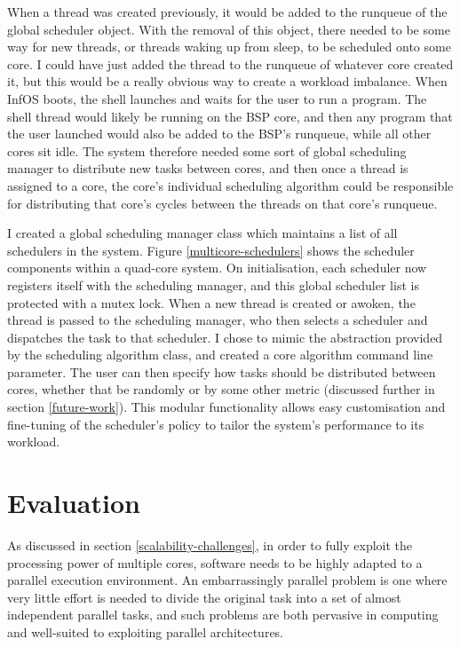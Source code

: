 \documentclass[bsc,frontabs,singlespacing,parskip,deptreport]{infthesis}
\begin{document}
When a thread was created previously, it would be added to the runqueue of the global scheduler object. With the removal of this object, there needed to be some way for new threads, or threads waking up from sleep, to be scheduled onto some core. I could have just added the thread to the runqueue of whatever core created it, but this would be a really obvious way to create a workload imbalance. When InfOS boots, the shell launches and waits for the user to run a program. The shell thread would likely be running on the BSP core, and then any program that the user launched would also be added to the BSP's runqueue, while all other cores sit idle. The system therefore needed some sort of global scheduling manager to distribute new tasks between cores, and then once a thread is assigned to a core, the core's individual scheduling algorithm could be responsible for distributing that core's cycles between the threads on that core's runqueue.

I created a global scheduling manager class which maintains a list of all schedulers in the system. Figure \ref{multicore-schedulers} shows the scheduler components within a quad-core system. On initialisation, each scheduler now registers itself with the scheduling manager, and this global scheduler list is protected with a mutex lock. When a new thread is created or awoken, the thread is passed to the scheduling manager, who then selects a scheduler and dispatches the task to that scheduler. I chose to mimic the abstraction provided by the scheduling algorithm class, and created a core algorithm command line parameter. The user can then specify how tasks should be distributed between cores, whether that be randomly or by some other metric (discussed further in section \ref{future-work}). This modular functionality allows easy customisation and fine-tuning of the scheduler's policy to tailor the system's performance to its workload.


\chapter{Evaluation}
As discussed in section \ref{scalability-challenges}, in order to fully exploit the processing power of multiple cores, software needs to be highly adapted to a parallel execution environment. An embarrassingly parallel problem is one where very little effort is needed to divide the original task into a set of almost independent parallel tasks, and such problems are both pervasive in computing and well-suited to exploiting parallel architectures. 
\end{document}
